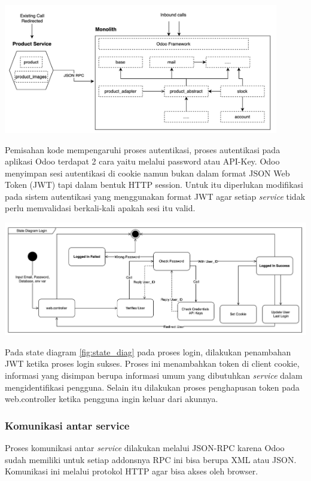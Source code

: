 \begin{center}
	\includegraphics[width=12cm]{img/bab_3/strangelExMicro.png}
	\label{fig:asd}
\end{center}

Pemisahan kode mempengaruhi proses autentikasi, proses autentikasi pada aplikasi Odoo terdapat 2 cara yaitu melalui password atau API-Key. Odoo menyimpan sesi autentikasi di cookie namun bukan dalam format JSON Web Token (JWT) tapi dalam bentuk HTTP session. Untuk itu diperlukan modifikasi pada sistem autentikasi yang menggunakan format JWT agar setiap \textit{service} tidak perlu memvalidasi berkali-kali apakah sesi itu valid. 

\begin{center}
	\includegraphics[width=14cm]{img/bab_3/stateDiagramLogin.png}
	\label{fig:state_diag}
\end{center}

Pada state diagram \ref{fig:state_diag} pada proses login, dilakukan penambahan JWT ketika proses login sukses. Proses ini menambahkan token  di client cookie, informasi yang disimpan berupa informasi umum yang dibutuhkan \textit{service} dalam mengidentifikasi pengguna. Selain itu dilakukan proses penghapusan token pada web.controller ketika pengguna ingin keluar dari akunnya.

\subsubsection{Komunikasi antar service}
Proses komunikasi antar \textit{service} dilakukan melalui JSON-RPC karena Odoo sudah memiliki untuk setiap addonsnya RPC ini bisa berupa XML atau JSON. Komunikasi ini melalui protokol  HTTP agar bisa akses oleh browser.  
\\
